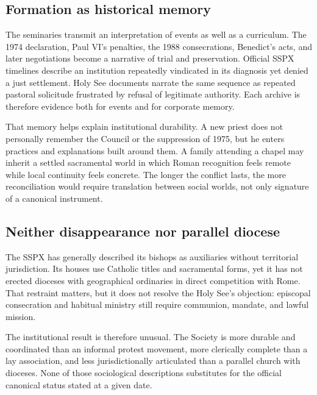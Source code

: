 \subsection{Formation as historical memory}

The seminaries transmit an interpretation of events as well as a curriculum. The 1974 declaration, Paul VI's penalties, the 1988 consecrations, Benedict's acts, and later negotiations become a narrative of trial and preservation. Official SSPX timelines describe an institution repeatedly vindicated in its diagnosis yet denied a just settlement. Holy See documents narrate the same sequence as repeated pastoral solicitude frustrated by refusal of legitimate authority. Each archive is therefore evidence both for events and for corporate memory.

That memory helps explain institutional durability. A new priest does not personally remember the Council or the suppression of 1975, but he enters practices and explanations built around them. A family attending a chapel may inherit a settled sacramental world in which Roman recognition feels remote while local continuity feels concrete. The longer the conflict lasts, the more reconciliation would require translation between social worlds, not only signature of a canonical instrument.

\subsection{Neither disappearance nor parallel diocese}

The SSPX has generally described its bishops as auxiliaries without territorial jurisdiction. Its houses use Catholic titles and sacramental forms, yet it has not erected dioceses with geographical ordinaries in direct competition with Rome. That restraint matters, but it does not resolve the Holy See's objection: episcopal consecration and habitual ministry still require communion, mandate, and lawful mission.

The institutional result is therefore unusual. The Society is more durable and coordinated than an informal protest movement, more clerically complete than a lay association, and less jurisdictionally articulated than a parallel church with dioceses. None of those sociological descriptions substitutes for the official canonical status stated at a given date.
